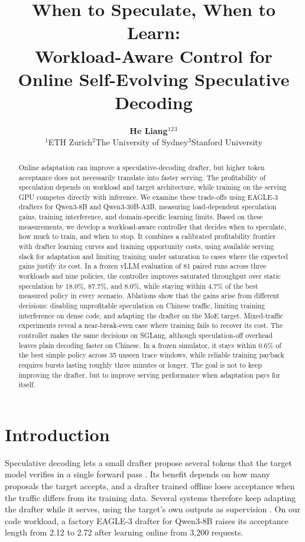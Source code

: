 \documentclass{article}
\title{When to Speculate, When to Learn:\\Workload-Aware Control for Online Self-Evolving Speculative Decoding}
\author{%
  {\bfseries He Liang}$^{1}$\quad{\bfseries Jingbo Wen}$^{2}$\quad{\bfseries Yue Yang}$^{3}$\\[3pt]
  $^{1}$ETH Zurich\quad $^{2}$The University of Sydney\quad $^{3}$Stanford University}
\begin{document}
\maketitle

\begin{abstract}
Online adaptation can improve a speculative-decoding drafter, but higher token acceptance does not necessarily translate into faster serving. The profitability of speculation depends on workload and target architecture, while training on the serving GPU competes directly with inference. We examine these trade-offs using EAGLE-3 drafters for Qwen3-8B and Qwen3-30B-A3B, measuring load-dependent speculation gains, training interference, and domain-specific learning limits. Based on these measurements, we develop a workload-aware controller that decides when to speculate, how much to train, and when to stop. It combines a calibrated profitability frontier with drafter learning curves and training opportunity costs, using available serving slack for adaptation and limiting training under saturation to cases where the expected gains justify its cost. In a frozen vLLM evaluation of 81 paired runs across three workloads and nine policies, the controller improves saturated throughput over static speculation by 18.0\%, 87.7\%, and 8.0\%, while staying within 4.7\% of the best measured policy in every scenario. Ablations show that the gains arise from different decisions: disabling unprofitable speculation on Chinese traffic, limiting training interference on dense code, and adapting the drafter on the MoE target. Mixed-traffic experiments reveal a near-break-even case where training fails to recover its cost. The controller makes the same decisions on SGLang, although speculation-off overhead leaves plain decoding faster on Chinese. In a frozen simulator, it stays within 0.6\% of the best simple policy across 35 unseen trace windows, while reliable training payback requires bursts lasting roughly three minutes or longer. The goal is not to keep improving the drafter, but to improve serving performance when adaptation pays for itself.
\end{abstract}

\section{Introduction}\label{sec:intro}

Speculative decoding lets a small drafter propose several tokens that the target model verifies in a single forward pass \citep{leviathan2023fast,chen2023accelerating}. Its benefit depends on how many proposals the target accepts, and a drafter trained offline loses acceptance when the traffic differs from its training data. Several systems therefore keep adapting the drafter while it serves, using the target's own outputs as supervision \citep{liu2024osd,qian2026drafts,wang2026aurora,park2026tide}. On our code workload, a factory EAGLE-3 drafter for Qwen3-8B raises its acceptance length from 2.12 to 2.72 after learning online from 3{,}200 requests.
\end{document}
